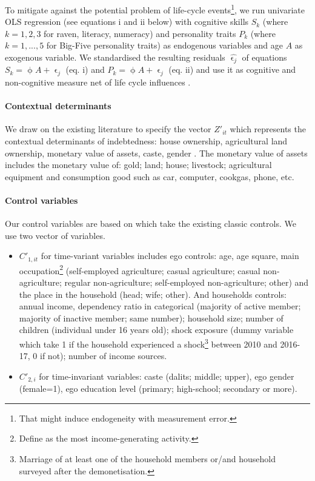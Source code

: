 \documentclass[a4paper, 11pt, onecolumn]{article}
\begin{document}
To mitigate against the potential problem of life-cycle events\footnote{That might induce endogeneity with measurement error.}, we run univariate OLS regression (see equations i and ii below) with  cognitive skills $S_k$ (where $k=1, 2, 3$ for raven, literacy, numeracy) and personality traits $P_k$ (where $k=1,...,5$ for Big-Five personality traits) as endogenous variables and age $A$ as exogenous variable.
We standardised the resulting residuals $\hat{\upvarepsilon_j}$ of equations $S_k=\upphi A+\upvarepsilon_j$ (eq. i) and $P_k=\upphi A+\upvarepsilon_j$ (eq. ii) and use it as cognitive and non-cognitive measure net of life cycle influences \citep{Nyhus2005, Brown2014}.

\paragraph{Contextual determinants}
We draw on the existing literature to specify the vector $Z'_{it}$ which represents the contextual determinants of indebtedness: house ownership, agricultural land ownership, monetary value of assets, caste, gender \citep{Guerin2012a, Guerin2013a, Guerin2014, Reboul2020}.
The monetary value of assets includes the monetary value of: gold; land; house; livestock; agricultural equipment and consumption good such as car, computer, cookgas, phone, etc.

\paragraph{Control variables}
Our control variables are based on \cite{Reboul2020, Brown2014, Chichaibelu2017} which take the existing classic controls. 
We use two vector of variables.
\begin{itemize}
\item $C'_{1,it}$ for time-variant variables includes ego controls: age, age square, main occupation\footnote{Define as the most income-generating activity.} (self-employed agriculture; casual agriculture; casual non-agriculture; regular non-agriculture; self-employed non-agriculture; other) and the place in the household (head; wife; other). 
And households controls: annual income, dependency ratio in categorical (majority of active member; majority of inactive member; same number); household size; number of children (individual under 16 years old); shock exposure (dummy variable which take 1 if the household experienced a shock\footnote{Marriage of at least one of the household members or/and household surveyed after the demonetisation.} between 2010 and 2016-17, 0 if not); number of income sources. 
\item $C'_{2,i}$ for time-invariant variables: caste (dalits; middle; upper), ego gender (female=1), ego education level (primary; high-school; secondary or more).
\end{itemize}
\end{document}
